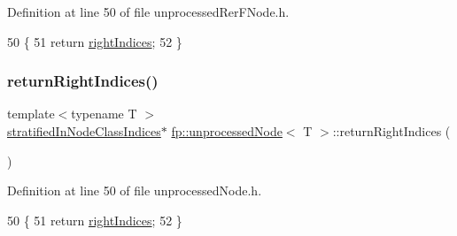 Definition at line 50 of file unprocessed\+Rer\+F\+Node.\+h.


\begin{DoxyCode}
50                                                                          \{
51                     \textcolor{keywordflow}{return} \hyperlink{classfp_1_1unprocessedNode_ac6886f626536370b1276374d4939291e}{rightIndices};
52                 \}
\end{DoxyCode}
\mbox{\label{classfp_1_1unprocessedNode_a41d3bd481930201d6fc481876fd84175}} 
\subsubsection{\texorpdfstring{return\+Right\+Indices()}{returnRightIndices()}\hspace{0.1cm}{\footnotesize\ttfamily [2/2]}}
{\footnotesize\ttfamily template$<$typename T $>$ \\
\hyperlink{classfp_1_1stratifiedInNodeClassIndices}{stratified\+In\+Node\+Class\+Indices}$\ast$ \hyperlink{classfp_1_1unprocessedNode}{fp\+::unprocessed\+Node}$<$ T $>$\+::return\+Right\+Indices (\begin{DoxyParamCaption}{ }\end{DoxyParamCaption})\hspace{0.3cm}{\ttfamily [inline]}}



Definition at line 50 of file unprocessed\+Node.\+h.


\begin{DoxyCode}
50                                                                          \{
51                     \textcolor{keywordflow}{return} \hyperlink{classfp_1_1unprocessedNode_ac6886f626536370b1276374d4939291e}{rightIndices};
52                 \}
\end{DoxyCode}
\mbox{\label{classfp_1_1unprocessedNode_ae7ad0b6bf8142ea5d3d851e29b5b9aee}} 
